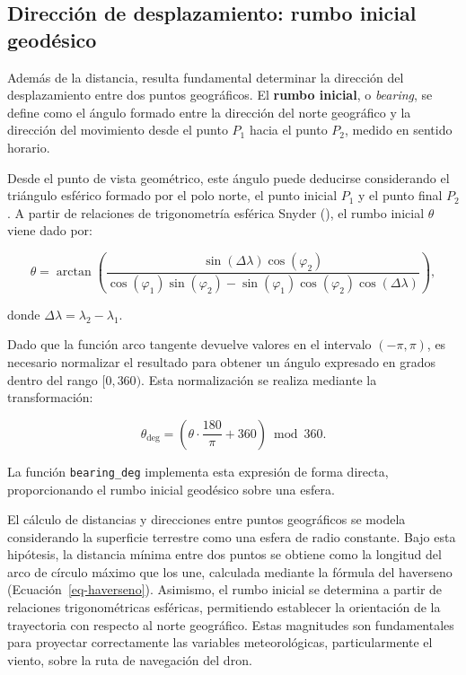 \documentclass[
  spanish,
  us-letterpaper,
]{scrreprt}
\numberwithin{equation}{section}
\begin{document}
\subsection{Dirección de desplazamiento: rumbo inicial
geodésico}\label{direcciuxf3n-de-desplazamiento-rumbo-inicial-geoduxe9sico}

Además de la distancia, resulta fundamental determinar la dirección del
desplazamiento entre dos puntos geográficos. El \textbf{rumbo inicial},
o \emph{bearing}, se define como el ángulo formado entre la dirección
del norte geográfico y la dirección del movimiento desde el punto
\(P_1\) hacia el punto \(P_2\), medido en sentido horario.

Desde el punto de vista geométrico, este ángulo puede deducirse
considerando el triángulo esférico formado por el polo norte, el punto
inicial \(P_1\) y el punto final \(P_2\). A partir de relaciones de
trigonometría esférica Snyder (), el
rumbo inicial \(\theta\) viene dado por:

\[
\theta = \arctan\left(
\frac{
\sin(\Delta\lambda)\cos(\varphi_2)
}{
\cos(\varphi_1)\sin(\varphi_2) - \sin(\varphi_1)\cos(\varphi_2)\cos(\Delta\lambda)
}
\right),
\]

donde \(\Delta\lambda = \lambda_2 - \lambda_1\).

Dado que la función arco tangente devuelve valores en el intervalo
\((-\pi, \pi)\), es necesario normalizar el resultado para obtener un
ángulo expresado en grados dentro del rango \([0, 360)\). Esta
normalización se realiza mediante la transformación:

\[
\theta_{\text{deg}} = \left(\theta \cdot \frac{180}{\pi} + 360\right) \bmod 360.
\]

La función \texttt{bearing\_deg} implementa esta expresión de forma
directa, proporcionando el rumbo inicial geodésico sobre una esfera.

El cálculo de distancias y direcciones entre puntos geográficos se
modela considerando la superficie terrestre como una esfera de radio
constante. Bajo esta hipótesis, la distancia mínima entre dos puntos se
obtiene como la longitud del arco de círculo máximo que los une,
calculada mediante la fórmula del haverseno
(Ecuación~\ref{eq-haverseno}). Asimismo, el rumbo inicial se determina a
partir de relaciones trigonométricas esféricas, permitiendo establecer
la orientación de la trayectoria con respecto al norte geográfico. Estas
magnitudes son fundamentales para proyectar correctamente las variables
meteorológicas, particularmente el viento, sobre la ruta de navegación
del dron.
\end{document}
